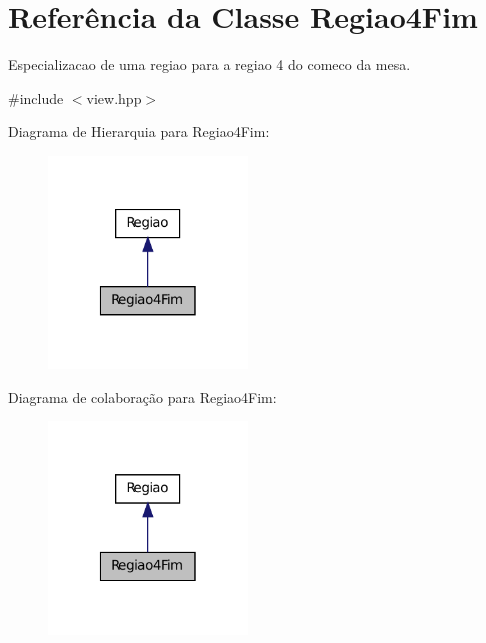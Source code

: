 \hypertarget{classRegiao4Fim}{
\section{Referência da Classe Regiao4Fim}
\label{classRegiao4Fim}
}


Especializacao de uma regiao para a regiao 4 do comeco da mesa.  




{\ttfamily \#include $<$view.hpp$>$}



Diagrama de Hierarquia para Regiao4Fim:\nopagebreak
\begin{figure}[H]
\begin{center}
\leavevmode
\includegraphics[width=150pt]{classRegiao4Fim__inherit__graph}
\end{center}
\end{figure}


Diagrama de colaboração para Regiao4Fim:\nopagebreak
\begin{figure}[H]
\begin{center}
\leavevmode
\includegraphics[width=150pt]{classRegiao4Fim__coll__graph}
\end{center}
\end{figure}
